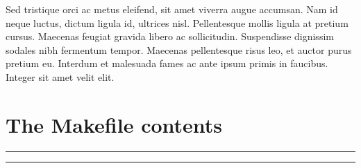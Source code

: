 \documentclass[a4paper,12pt]{article}
\begin{document}
Sed tristique orci ac metus eleifend, sit amet viverra augue accumsan. Nam id neque luctus, dictum ligula id, ultrices nisl. Pellentesque mollis ligula at pretium cursus. Maecenas feugiat gravida libero ac sollicitudin. Suspendisse dignissim sodales nibh fermentum tempor. Maecenas pellentesque risus leo, et auctor purus pretium eu. Interdum et malesuada fames ac ante ipsum primis in faucibus. Integer sit amet velit elit.

\section{The Makefile contents}

\hrule

\hrule

\section{}
\end{document}
